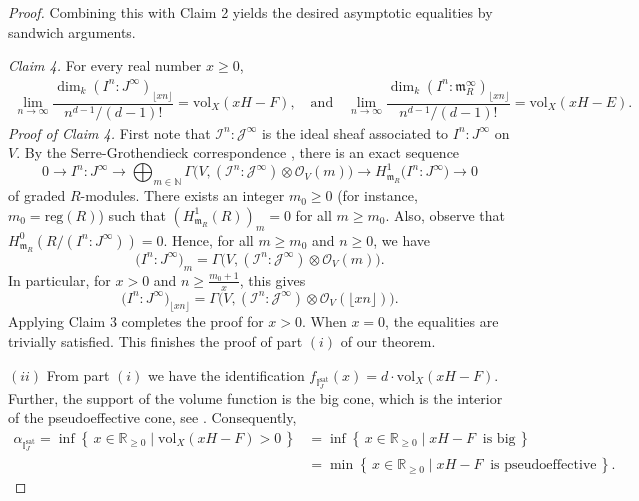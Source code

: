 \documentclass[12pt,a4paper]{amsart}
\theoremstyle{plain}
\theoremstyle{definition}
\numberwithin{equation}{theorem}
\begin{document}
\begin{proof}
Combining this with Claim 2 yields the desired asymptotic equalities by sandwich arguments.

\vspace{0.6em}
\noindent\textit{Claim 4.} For every real number $x\geq 0$,
\begin{align*}
 \lim_{n\to\infty}\dfrac{\dim_k {\left(I^n \colon J^{\infty}\right)}_{\lfloor xn \rfloor}}{n^{d-1}/(d-1)!} = \mathrm{vol}_X(xH-F), \quad \text{and} \quad \lim_{n\to\infty}\dfrac{\dim_k {\left(I^n \colon \mathfrak{m}_R^{\infty}\right)}_{\lfloor xn \rfloor}}{n^{d-1}/(d-1)!} = \mathrm{vol}_X(xH-E).
\end{align*}
\textit{Proof of Claim 4.} First note that $\mathcal{I}^n\colon \mathcal{J}^{\infty}$ is the ideal sheaf associated to $I^n\colon J^{\infty}$ on $V$. By the Serre-Grothendieck correspondence \cite[Proposition 2.2]{Har67}, there is an exact sequence $$0 \to I^n \colon J^{\infty} \to \bigoplus_{m\in\mathbb{N}}\Gamma\big(V,(\mathcal{I}^n\colon \mathcal{J}^{\infty})\otimes\mathcal{O}_V(m)\big) \to H^1_{\mathfrak{m}_R}\big(I^n \colon J^{\infty}\big) \to 0$$ of graded $R$-modules. There exists an integer $m_0\geq 0$ (for instance, $m_0 = \mathrm{reg}(R)$) such that $\left(H^1_{\mathfrak{m}_R}(R)\right)_m = 0$ for all $m\geq m_0$. Also, observe that $H^0_{\mathfrak{m}_R}(R/(I^n\colon J^{\infty}))=0$. Hence, for all $m\geq m_0$ and $n\geq 0$, we have $${\big(I^n : J^{\infty}\big)}_m = \Gamma\big(V,(\mathcal{I}^n\colon \mathcal{J}^{\infty})\otimes\mathcal{O}_V(m)\big).$$ In particular, for $x>0$ and $n\geq \frac{m_0+1}{x}$, this gives $${\big(I^n\colon J^{\infty}\big)}_{\lfloor xn\rfloor} = \Gamma\big(V,(\mathcal{I}^n : \mathcal{J}^{\infty})\otimes\mathcal{O}_V(\lfloor xn\rfloor)\big).$$ Applying Claim 3 completes the proof for $x>0$. When $x=0$, the equalities are trivially satisfied. This finishes the proof of part $(i)$ of our theorem.

\textit{$(ii)$} From part $(i)$ we have the identification $f_{\mathbb{I}^{\mathrm{sat}}_J}(x) = d\cdot\mathrm{vol}_X(xH-F)$. Further, the support of the volume function is the big cone, which is the interior of the pseudoeffective cone, see \cite[Theorem 2.2.26]{Laz04a}. Consequently,
\begin{align*}
 \alpha_{\mathbb{I}^{\mathrm{sat}}_J} = \inf \left\{\, x \in \mathbb{R}_{\geq 0} \mid \mathrm{vol}_X(xH-F)>0 \,\right\} &= \inf \left\{\, x \in \mathbb{R}_{\geq 0} \mid xH-F\;\;\text{is big} \,\right\}\\
 &= \min \left\{\, x \in \mathbb{R}_{\geq 0} \mid xH-F\;\;\text{is pseudoeffective} \,\right\}.
\end{align*}


\end{proof}
\end{document}
